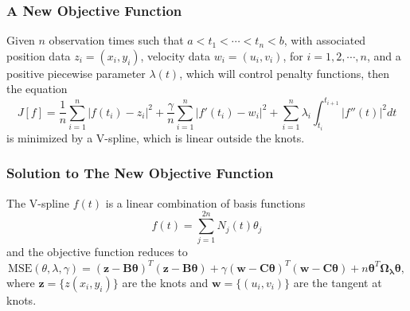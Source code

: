 \documentclass{beamer}
\begin{document}
\begin{frame}
\frametitle{A New Objective Function}
Given $n$ observation times such that $a<t_1<\cdots <t_n<b$, with associated position data $z_i=(x_i,y_i)$, velocity data $w_i=(u_i,v_i)$, for $i=1,2,\cdots,n$, and a positive piecewise parameter $\lambda(t)$, which will control penalty functions, then the equation
\begin{equation}\label{obtractor}
J[f]=\frac{1}{n}\sum_{i=1}^n|f(t_i)-z_i|^2+\frac{\gamma}{n}\sum_{i=1}^{n}|f'(t_i)-w_i|^2+\sum_{i=1}^n\lambda_i\int_{t_i}^{t_{i+1}}|f''(t)|^2 dt
\end{equation}
is minimized by a V-spline, which is linear outside the knots. 
\end{frame}


\begin{frame}
\frametitle{Solution to The New Objective Function}
The V-spline $f(t)$ is a linear combination of basis functions
\begin{equation*}
f(t)=\sum_{j=1}^{2n} N_j(t)\theta_j 
\end{equation*}
and the objective function reduces to
\begin{equation*}
\mbox{MSE}(\theta,\lambda,\gamma)=(\mathbf{z}-\mathbf{B}\mathbf{\theta})^T(\mathbf{z}-\mathbf{B}\mathbf{\theta})+\gamma(\mathbf{w}-\mathbf{C}\mathbf{\theta})^T(\mathbf{w}-\mathbf{C}\mathbf{\theta})+n\mathbf{\theta}^T\mathbf{\Omega_\lambda}\mathbf{\theta},
\end{equation*}
where $\mathbf{z}=\{z(x_i,y_i)\}$ are the knots and $\mathbf{w}=\{(u_i,v_i)\}$ are the tangent at knots.
\end{frame}


\end{document}
